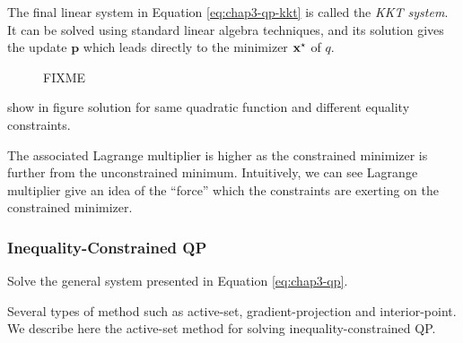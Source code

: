 The final linear system in Equation \ref{eq:chap3-qp-kkt} is called
the \emph{KKT system}. It can be solved using standard linear algebra
techniques, and its solution gives the update $\mathbf{p}$ which leads
directly to the minimizer $\mathbf{x}^{\star}$ of $q$.

\begin{figure}
      \caption{FIXME}
      \label{fig:chap3-qp-equality}
\end{figure}

show in figure solution for same quadratic function and different
equality constraints.

The associated Lagrange multiplier is higher as the constrained
minimizer is further from the unconstrained minimum. Intuitively, we
can see Lagrange multiplier give an idea of the ``force'' which the
constraints are exerting on the constrained minimizer.

\subsubsection{Inequality-Constrained QP}

Solve the general system presented in Equation \ref{eq:chap3-qp}.

Several types of method such as active-set, gradient-projection and
interior-point. We describe here the active-set method for solving
inequality-constrained QP.

